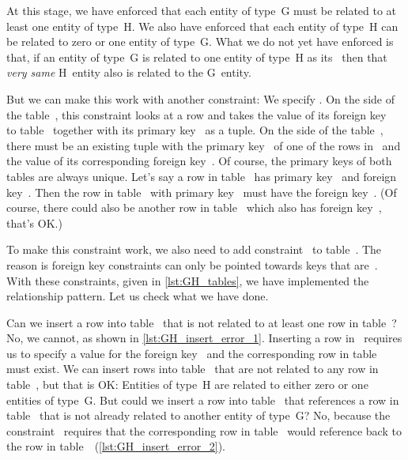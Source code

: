 At this stage, we have enforced that each entity of type~G must be related to at least one entity of type~H.
We also have enforced that each entity of type~H can be related to zero or one entity of type~G.
What we do not yet have enforced is that, if an entity of type~G is related to one entity of type~H as its~ then that \emph{very same} H~entity also is related to the G~entity.%
%
\begin{sloppypar}%
But we can make this work with another constraint:
We specify .
On the side of the table~, this constraint looks at a row and takes the value of its foreign key~ to table~ together with its primary key~ as a tuple.
On the side of the table~, there must be an existing tuple with the primary key~ of one of the rows in~ and the value of its corresponding foreign key~.
Of course, the primary keys of both tables are always unique.
Let's say a row in table~ has primary key~ and foreign key~.
Then the row in table~ with primary key~ must have the foreign key~.
(Of course, there could also be another row in table~ which also has foreign key~, that's OK.)%
\end{sloppypar}%
%
\begin{sloppypar}%
To make this constraint work, we also need to add constraint~ to table~.
The reason is foreign key  constraints can only be pointed towards keys that are~.
With these constraints, given in \cref{lst:GH_tables}, we have implemented the relationship pattern.
Let us check what we have done.%
\end{sloppypar}%
%
Can we insert a row into table~ that is not related to at least one row in table~?
No, we cannot, as shown in \cref{lst:GH_insert_error_1}.
Inserting a row in~ requires us to specify a value for the foreign key~ and the corresponding row in table~ must exist.
We can insert rows into table~ that are not related to any row in table~, but that is OK:
Entities of type~H are related to either zero or one entities of type~G.
But could we insert a row into table~ that references a row in table~ that is not already related to another entity of type~G?
No, because the constraint~ requires that the corresponding row in table~ would reference back to the row in table~~(\cref{lst:GH_insert_error_2}).

